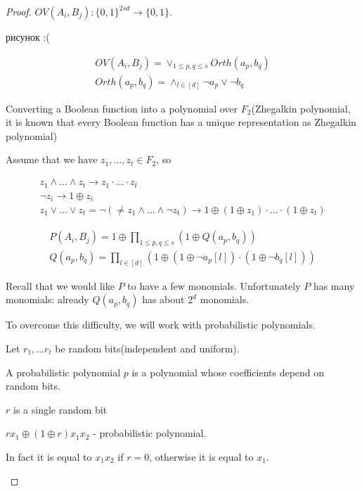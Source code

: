 \begin{proof}
	$OV(A_i, B_j) : \{0, 1\}^{2sd} \to \{0, 1\}$.

	{\color{red} рисунок :(}

	\begin{align*}
		OV(A_i, B_j) = \lor_{1 \leq p, q \leq s} Orth(a_p, b_q) \\
		Orth(a_p, b_q) = \land_{l \in [d]} \neg a_p \lor \neg b_q
	\end{align*}

	Converting a Boolean function into a polynomial over $F_2$(Zhegalkin polynomial, it is known that every Boolean function has a unique representation as Zhegalkin polynomial)

	Assume that we have $z_1, \dots, z_t \in F_2$, so

	\begin{align*}
		z_1 \land \dots \land z_t \to z_1 \cdot \dots \cdot z_t \\
		\neg z_i \to 1 \oplus z_i \\
		z_1 \lor \dots \lor z_t = \neg (\neq z_1 \land \dots \land \neg z_t) \to 1 \oplus (1 \oplus z_1) \cdot \dots \cdot (1 \oplus z_t)
	\end{align*}

	\begin{align*}
		P(A_i, B_j) = 1 \oplus \prod_{1 \leq p, q \leq s} (1 \oplus Q(a_p, b_q))\\
		Q(a_p, b_q) = \prod_{l \in [d]} (1 \oplus (1 \oplus \neg a_p[l]) \cdot (1 \oplus \neg b_q[l]))
	\end{align*}

	Recall that we would like $P$ to have a few monomials.
	Unfortunately $P$ has many monomials: already $Q(a_p, b_q)$ has about $2^{d}$ monomials.

	To overcome this difficulty, we will work with probabilistic polynomials.

	\begin{df}

		Let $r_1, \dots r_t$ be random bits(independent and uniform).

		A probabilistic polynomial $p$ is a polynomial whose coefficients depend on random bits.
	\end{df}

	\begin{exmpl}
		$r$ is a single random bit

		$r x_1 \oplus (1 \oplus r) x_1 x_2$ - probabilistic polynomial.

		In fact it is equal to $x_1 x_2$ if $r = 0$, otherwise it is equal to $x_1$.
	\end{exmpl}


\end{proof}
